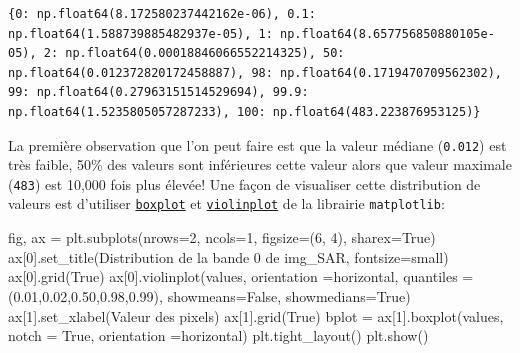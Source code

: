 \documentclass[
  11pt,
  letterpaper,
  open=any,
  twoside=false,
  french]{scrbook}
\newenvironment{Shaded}{\begin{snugshade}}{\end{snugshade}}
\newcommand{\DecValTok}[1]{\textcolor[rgb]{0.68,0.00,0.00}{#1}}
\newcommand{\FloatTok}[1]{\textcolor[rgb]{0.68,0.00,0.00}{#1}}
\newcommand{\NormalTok}[1]{\textcolor[rgb]{0.00,0.23,0.31}{#1}}
\newcommand{\OperatorTok}[1]{\textcolor[rgb]{0.37,0.37,0.37}{#1}}
\newcommand{\StringTok}[1]{\textcolor[rgb]{0.13,0.47,0.30}{#1}}
\newcommand{\VariableTok}[1]{\textcolor[rgb]{0.07,0.07,0.07}{#1}}
\begin{document}
\begin{verbatim}
{0: np.float64(8.172580237442162e-06), 0.1: np.float64(1.588739885482937e-05), 1: np.float64(8.657756850880105e-05), 2: np.float64(0.00018846066552214325), 50: np.float64(0.012372820172458887), 98: np.float64(0.1719470709562302), 99: np.float64(0.27963151514529694), 99.9: np.float64(1.5235805057287233), 100: np.float64(483.223876953125)}
\end{verbatim}

La première observation que l'on peut faire est que la valeur médiane
(\texttt{0.012}) est très faible, 50\% des valeurs sont inférieures
cette valeur alors que valeur maximale (\texttt{483}) est 10,000 fois
plus élevée! Une façon de visualiser cette distribution de valeurs est
d'utiliser
\href{https://matplotlib.org/stable/api/_as_gen/matplotlib.pyplot.boxplot.html}{\texttt{boxplot}}
et
\href{https://matplotlib.org/stable/api/_as_gen/matplotlib.pyplot.violinplot.html}{\texttt{violinplot}}
de la librairie \texttt{matplotlib}:

\begin{Shaded}
\begin{Highlighting}[]
\NormalTok{fig, ax }\OperatorTok{=}\NormalTok{ plt.subplots(nrows}\OperatorTok{=}\DecValTok{2}\NormalTok{, ncols}\OperatorTok{=}\DecValTok{1}\NormalTok{, figsize}\OperatorTok{=}\NormalTok{(}\DecValTok{6}\NormalTok{, }\DecValTok{4}\NormalTok{), sharex}\OperatorTok{=}\VariableTok{True}\NormalTok{)}
\NormalTok{ax[}\DecValTok{0}\NormalTok{].set\_title(}\StringTok{\textquotesingle{}Distribution de la bande 0 de img\_SAR\textquotesingle{}}\NormalTok{, fontsize}\OperatorTok{=}\StringTok{\textquotesingle{}small\textquotesingle{}}\NormalTok{)}
\NormalTok{ax[}\DecValTok{0}\NormalTok{].grid(}\VariableTok{True}\NormalTok{)}
\NormalTok{ax[}\DecValTok{0}\NormalTok{].violinplot(values, orientation  }\OperatorTok{=}\StringTok{\textquotesingle{}horizontal\textquotesingle{}}\NormalTok{, }
\NormalTok{                 quantiles }\OperatorTok{=}\NormalTok{(}\FloatTok{0.01}\NormalTok{,}\FloatTok{0.02}\NormalTok{,}\FloatTok{0.50}\NormalTok{,}\FloatTok{0.98}\NormalTok{,}\FloatTok{0.99}\NormalTok{),}
\NormalTok{                  showmeans}\OperatorTok{=}\VariableTok{False}\NormalTok{,}
\NormalTok{                  showmedians}\OperatorTok{=}\VariableTok{True}\NormalTok{)}
\NormalTok{ax[}\DecValTok{1}\NormalTok{].set\_xlabel(}\StringTok{\textquotesingle{}Valeur des pixels\textquotesingle{}}\NormalTok{)}
\NormalTok{ax[}\DecValTok{1}\NormalTok{].grid(}\VariableTok{True}\NormalTok{)}
\NormalTok{bplot }\OperatorTok{=}\NormalTok{ ax[}\DecValTok{1}\NormalTok{].boxplot(values, notch }\OperatorTok{=} \VariableTok{True}\NormalTok{, orientation  }\OperatorTok{=}\StringTok{\textquotesingle{}horizontal\textquotesingle{}}\NormalTok{)}
\NormalTok{plt.tight\_layout()}
\NormalTok{plt.show()}
\end{Highlighting}
\end{Shaded}
\end{document}
